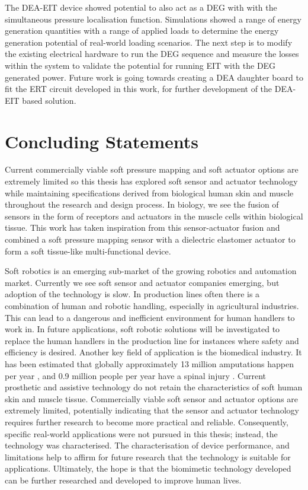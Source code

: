 The DEA-EIT device showed potential to also act as a DEG with with the simultaneous pressure localisation function. Simulations showed a range of energy generation quantities with a range of applied loads to determine the energy generation potential of real-world loading scenarios. The next step is to modify the existing electrical hardware to run the DEG sequence and measure the losses within the system to validate the potential for running EIT with the DEG generated power. Future work is going towards creating a DEA daughter board to fit the ERT circuit developed in this work, for further development of the DEA-EIT based solution.

\section{Concluding Statements}
Current commercially viable soft pressure mapping and soft actuator options are extremely limited so this thesis has explored soft sensor and actuator technology while maintaining specifications derived from biological human skin and muscle throughout the research and design process. In biology, we see the fusion of sensors in the form of receptors and actuators in the muscle cells within biological tissue. This work has taken inspiration from this sensor-actuator fusion and combined a soft pressure mapping sensor with a dielectric elastomer actuator to form a soft tissue-like multi-functional device.

Soft robotics is an emerging sub-market of the growing robotics and automation market. Currently we see soft sensor and actuator companies emerging, but adoption of the technology is slow. In production lines often there is a combination of human and robotic handling, especially in agricultural industries. This can lead to a dangerous and inefficient environment for human handlers to work in. In future applications, soft robotic solutions will be investigated to replace the human handlers in the production line for instances where safety and efficiency is desired. Another key field of application is the biomedical industry. It has been estimated that globally approximately 13 million amputations happen per year \cite{Yuan2023a}, and 0.9 million people per year have a spinal injury \cite{Ding2022}. Current prosthetic and assistive technology do not retain the characteristics of soft human skin and muscle tissue. Commercially viable soft sensor and actuator options are extremely limited, potentially indicating that the sensor and actuator technology requires further research to become more practical and reliable. Consequently, specific real-world applications were not pursued in this thesis; instead, the technology was characterised. The characterisation of device performance, and limitations help to affirm for future research that the technology is suitable for applications. Ultimately, the hope is that the biomimetic technology developed can be further researched and developed to improve human lives.

